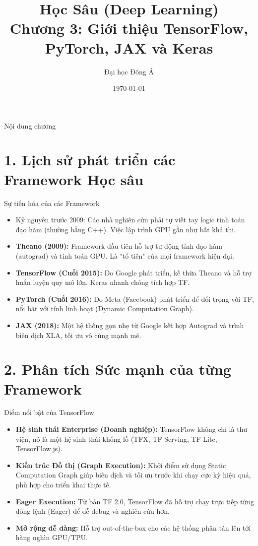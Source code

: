 \documentclass[aspectratio=169]{beamer}
\title[Chương 3: Frameworks \& Keras]{Học Sâu (Deep Learning) \\ \vspace{0.5cm} \Large Chương 3: Giới thiệu TensorFlow, PyTorch, JAX và Keras}
\author{Đại học Đông Á}
\date{\today}
\begin{document}
\begin{frame}
    \titlepage
\end{frame}

\begin{frame}{Nội dung chương}
    \tableofcontents
\end{frame}

\section{1. Lịch sử phát triển các Framework Học sâu}

\begin{frame}{Sự tiến hóa của các Framework}
    \begin{itemize}
        \item Kỷ nguyên trước 2009: Các nhà nghiên cứu phải tự viết tay logic tính toán đạo hàm (thường bằng C++). Việc lập trình GPU gần như bất khả thi.
        \item \textbf{Theano (2009):} Framework đầu tiên hỗ trợ tự động tính đạo hàm (autograd) và tính toán GPU. Là "tổ tiên" của mọi framework hiện đại.
        \item \textbf{TensorFlow (Cuối 2015):} Do Google phát triển, kế thừa Theano và hỗ trợ huấn luyện quy mô lớn. Keras nhanh chóng tích hợp TF.
        \item \textbf{PyTorch (Cuối 2016):} Do Meta (Facebook) phát triển để đối trọng với TF, nổi bật với tính linh hoạt (Dynamic Computation Graph).
        \item \textbf{JAX (2018):} Một hệ thống gọn nhẹ từ Google kết hợp Autograd và trình biên dịch XLA, tối ưu vô cùng mạnh mẽ.
    \end{itemize}
\end{frame}

\section{2. Phân tích Sức mạnh của từng Framework}

\begin{frame}{Điểm nổi bật của TensorFlow}
    \begin{itemize}
        \item \textbf{Hệ sinh thái Enterprise (Doanh nghiệp):} TensorFlow không chỉ là thư viện, nó là một hệ sinh thái khổng lồ (TFX, TF Serving, TF Lite, TensorFlow.js).
        \item \textbf{Kiến trúc Đồ thị (Graph Execution):} Khởi điểm sử dụng Static Computation Graph giúp biên dịch và tối ưu trước khi chạy cực kỳ hiệu quả, phù hợp cho triển khai thực tế.
        \item \textbf{Eager Execution:} Từ bản TF 2.0, TensorFlow đã hỗ trợ chạy trực tiếp từng dòng lệnh (Eager) để dễ debug và nghiên cứu hơn.
        \item \textbf{Mở rộng dễ dàng:} Hỗ trợ out-of-the-box cho các hệ thống phân tán lên tới hàng nghìn GPU/TPU.
    \end{itemize}
\end{frame}
\end{document}
